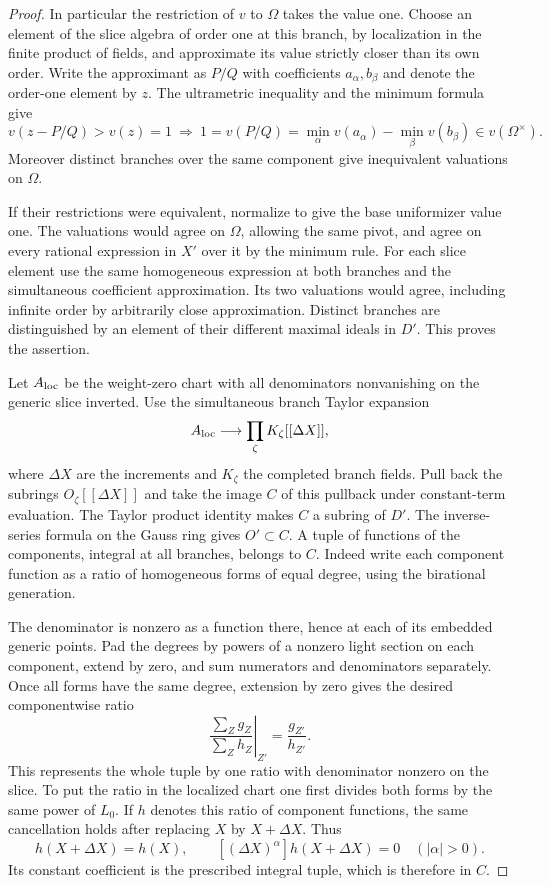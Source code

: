 \begin{proof}
In particular the restriction of \(v\) to \(\Omega\) takes
the value one. Choose an element of the slice algebra of
order one at this branch, by localization in the finite
product of fields, and approximate its value strictly closer
than its own order. Write the approximant as \(P/Q\) with coefficients \(a_\alpha,b_\beta\)
and denote the order-one element by \(z\). The ultrametric inequality
and the minimum formula give
\[
 v(z-P/Q)>v(z)=1
 \ \Longrightarrow\ 
 1=v(P/Q)=\min_\alpha v(a_\alpha)-\min_\beta v(b_\beta)
 \in v(\Omega^\times).
\] Moreover distinct branches over the
same component give inequivalent valuations on \(\Omega\).

If their restrictions were equivalent, normalize to give
the base uniformizer value one. The valuations would agree
on \(\Omega\), allowing the same pivot, and agree on every
rational expression in \(X'\) over it by the minimum rule.
For each slice element use the same homogeneous expression
at both branches and the simultaneous coefficient approximation.
Its two valuations would agree, including infinite order by
arbitrarily close approximation. Distinct branches are
distinguished by an element of their different maximal
ideals in \(D'\). This proves the assertion.

Let \(A_{\rm loc}\) be the weight-zero chart with all
denominators nonvanishing on the generic slice inverted.
Use the simultaneous branch Taylor expansion
\[
 A_{\rm loc}\longrightarrow \prod_\zeta
                           K_\zeta[[\Delta X]],
\]
where \(\Delta X\) are the increments and \(K_\zeta\) the
completed branch fields. Pull back the subrings
\(O_\zeta[[\Delta X]]\) and take the image \(C\) of this
pullback under constant-term evaluation. The Taylor
product identity makes \(C\) a subring of \(D'\).
The inverse-series formula on the Gauss ring gives
\(O'\subset C\).
A tuple of functions of the components, integral at all
branches, belongs to \(C\). Indeed write each component
function as a ratio of homogeneous forms of equal degree,
using the birational generation.

The denominator is nonzero
as a function there, hence at each of its embedded generic
points. Pad the degrees by powers of a nonzero light section
on each component, extend by zero, and sum numerators and
denominators separately.
Once all forms have the same degree, extension by zero gives the desired componentwise ratio
\[
  \left.\frac{\sum_Z g_Z}{\sum_Z h_Z}\right|_{Z'}=\frac{g_{Z'}}{h_{Z'}} .
\]
 This represents the whole tuple
by one ratio with denominator nonzero on the slice. To put
the ratio in the localized chart one first divides both forms
by the same power of \(L_0\). If \(h\) denotes this ratio of component functions, the same cancellation
holds after replacing \(X\) by \(X+\Delta X\). Thus
\[
 h(X+\Delta X)=h(X),\qquad
 [(\Delta X)^\alpha]h(X+\Delta X)=0\quad (|\alpha|>0).
\]
Its constant coefficient is the prescribed integral tuple, which is
therefore in \(C\).


\end{proof}

